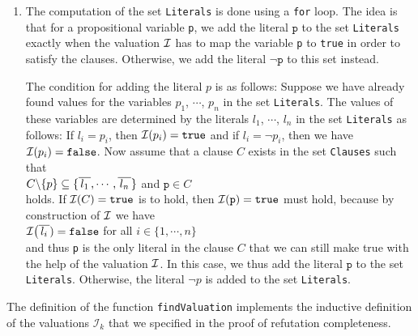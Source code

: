 \begin{enumerate}
\begin{enumerate}
      \end{enumerate}
\item The computation of the set \texttt{Literals} is done using a \texttt{for} loop.
      The idea is that for a propositional variable \texttt{p}, we add the literal
      $\texttt{p}$ to the set \texttt{Literals} exactly when the valuation $\mathcal{I}$ has to map the variable \texttt{p}
      to \texttt{true} in order to satisfy the clauses. Otherwise, we add
      the literal $\neg\texttt{p}$ to this set instead.

      The condition for adding the literal $p$ is as follows:
      Suppose we have already found values for the variables
      $p_1$, $\cdots$, $p_n$ in the set \texttt{Literals}.
      The values of these variables are determined by the literals $l_1$, $\cdots$, $l_n$ in the set \texttt{Literals}
      as follows: If $l_i = p_i$, then $\mathcal{I}(p_i) = \texttt{true}$
      and if $l_i = \neg p_i$, then we have $\mathcal{I}(p_i) = \texttt{false}$.
      Now assume that a clause $C$ exists in the set \texttt{Clauses} such that
      \\[0.2cm]
      \hspace*{1.3cm}
      $C \backslash \{p\} \subseteq \{ \overline{\,l_1\,}, \cdots, \overline{\,l_n\,} \}$ \quad and \quad $\texttt{p} \in C$
      \\[0.2cm]
      holds. If $\mathcal{I}(C) = \texttt{true}$ is to hold, then $\mathcal{I}(\texttt{p}) = \texttt{true}$ must hold, because
      by construction of $\mathcal{I}$ we have
      \\[0.2cm]
      \hspace*{1.3cm}
      $\mathcal{I}\bigl(\overline{\,l_i\,}) = \texttt{false}$ \quad for all $i \in \{1,\cdots,n\}$
      \\[0.2cm]
      and thus \texttt{p} is the only literal in the clause $C$ that we can still make true with the help of the valuation $\mathcal{I}$. In this case, we thus add the literal
      $\texttt{p}$ to the set \texttt{Literals}. Otherwise, the literal $\neg p$ is added to the set
      \texttt{Literals}.
\end{enumerate}
The definition of the function \texttt{findValuation} implements the inductive definition of the valuations
$\mathcal{I}_k$ that we specified in the proof of refutation completeness.


